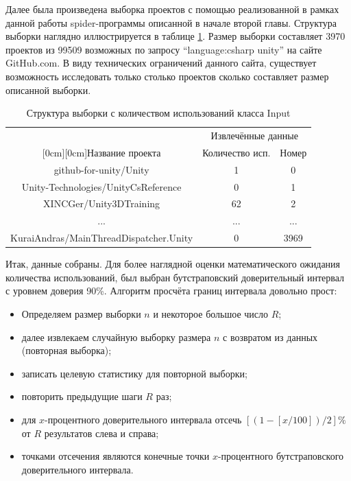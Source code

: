 Далее была произведена выборка проектов с помощью реализованной в рамках данной работы spider-программы описанной в начале второй главы. Структура выборки наглядно иллюстрируется в таблице \ref{tab:sample}. Размер выборки составляет 3970 проектов из 99509 возможных по запросу ``language:csharp unity'' на сайте GitHub.com. В виду технических ограничений данного сайта, существует возможность исследовать только столько проектов сколько составляет размер описанной выборки.

\begin{table}[H]
	\caption{\label{tab:sample}Структура выборки с количеством использований класса Input}
	\begin{center}
		\begin{tabular}{|c|c|c|}
			\hline
			& \multicolumn{2}{c|}{Извлечённые данные} \\
			\cline{2-3}
			\raisebox{1.5ex}[0cm][0cm]{Название проекта}
			& Количество исп. & Номер \\
			\hline
			github-for-unity/Unity & 1 & 0 \\
			\hline
			Unity-Technologies/UnityCsReference & 0 & 1 \\
			\hline
			XINCGer/Unity3DTraining & 62 & 2 \\
			\hline
			... & ... & ... \\
			\hline
			KuraiAndras/MainThreadDispatcher.Unity & 0 & 3969 \\
			\hline
		\end{tabular}
	\end{center}
\end{table}

Итак, данные собраны. Для более наглядной оценки математического ожидания количества использований, был выбран бутстраповский доверительный интервал \cite{oreilly} с уровнем доверия 90\%. Алгоритм просчёта границ интервала довольно прост:

\begin{itemize}
	\item Определяем размер выборки $n$ и некоторое большое число $R$;
	\item далее извлекаем случайную выборку размера $n$ с возвратом из данных (повторная выборка);
	\item записать целевую статистику для повторной выборки;
	\item повторить предыдущие шаги $R$ раз;
	\item для $x$-процентного доверительного интервала отсечь $\left[(1-\left[x / 100\right])/2\right]\%$ от $R$ результатов слева и справа;
	\item точками отсечения являются конечные точки $x$-процентного бутстраповского доверительного интервала.
\end{itemize}

